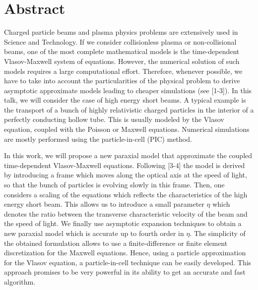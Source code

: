 \documentclass[article, A4, 11pt]{llncs}%
\begin{document}
\section*{Abstract}
Charged particle beams and plasma physics problems are extensively used in Science and Technology. If we consider collisionless plasma or non-collisional beams, one of the most complete mathematical models is the time-dependent Vlasov-Maxwell system of equations. However, the numerical solution of such models requires a large computational effort. Therefore, whenever possible, we have to take into account the particularities of the physical problem to derive asymptotic approximate models leading to cheaper simulations (see [1-3]). In this talk, we will consider the case of high energy short beams. A typical example is the transport of a bunch of highly relativistic charged particles in the interior of a perfectly conducting hollow tube. This is usually modeled by the Vlasov equation, coupled with the Poisson or Maxwell equations. Numerical simulations are mostly performed using the particle-in-cell (PIC) method.

In this work, we will propose a new paraxial model that approximate the coupled  time-dependent Vlasov-Maxwell equations. Following [3-4] the model is derived by introducing a frame  which moves along the optical axis at the speed of light, so that the bunch of particles  is evolving slowly in this frame. Then, one considers a scaling of the equations which reflects the characteristics of the high energy short beam. This allows us to introduce a small parameter $\eta$ which denotes the ratio between the transverse characteristic velocity of the beam and the speed  of light. We finally use asymptotic expansion techniques to obtain a new paraxial model which is accurate up to fourth order in $\eta$. The simplicity of the obtained formulation allows to use a finite-difference or finite element discretization for the Maxwell equations. Hence, using a particle approximation for the Vlasov equation, a particle-in-cell technique can be easily developed. This approach promises to be very powerful in its ability to get an accurate and fast algorithm.
\end{document}
